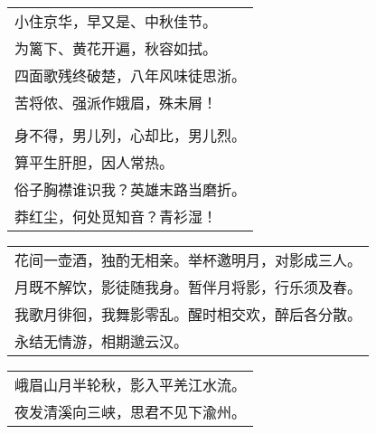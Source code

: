 \nopagebreak%
\nopagebreak%
\noindent\begin{minipage}{\linewidth}
  \vskip-3pt\begin{table}[H]
    \centering
    \begin{tabular}{@{}l@{}}
小住京华，早又是、中秋佳节。\\
为篱下、黄花开遍，秋容如拭。\\
四面歌残终破楚，八年风味徒思浙。\\
苦将侬、强派作娥眉，殊未屑！\\
\\
身不得，男儿列，心却比，男儿烈。\\
算平生肝胆，因人常热。\\
俗子胸襟谁识我？英雄末路当磨折。\\
莽红尘，何处觅知音？青衫湿！
    \end{tabular}
  \end{table}
\end{minipage}
\vspace{1cm}


\nopagebreak%
\nopagebreak%
\noindent\begin{minipage}{\linewidth}
  \vskip-3pt\begin{table}[H]
    \centering
    \begin{tabular}{@{}l@{}}
花间一壶酒，独酌无相亲。举杯邀明月，对影成三人。\\
月既不解饮，影徒随我身。暂伴月将影，行乐须及春。\\
我歌月徘徊，我舞影零乱。醒时相交欢，醉后各分散。\\
永结无情游，相期邈云汉。
    \end{tabular}
  \end{table}
\end{minipage}
\vspace{1cm}


\nopagebreak%
\nopagebreak%
\noindent\begin{minipage}{\linewidth}
  \vskip-3pt\begin{table}[H]
    \centering
    \begin{tabular}{@{}l@{}}
峨眉山月半轮秋，影入平羌江水流。\\
夜发清溪向三峡，思君不见下渝州。
    \end{tabular}
  \end{table}
\end{minipage}
\vspace{1cm}



